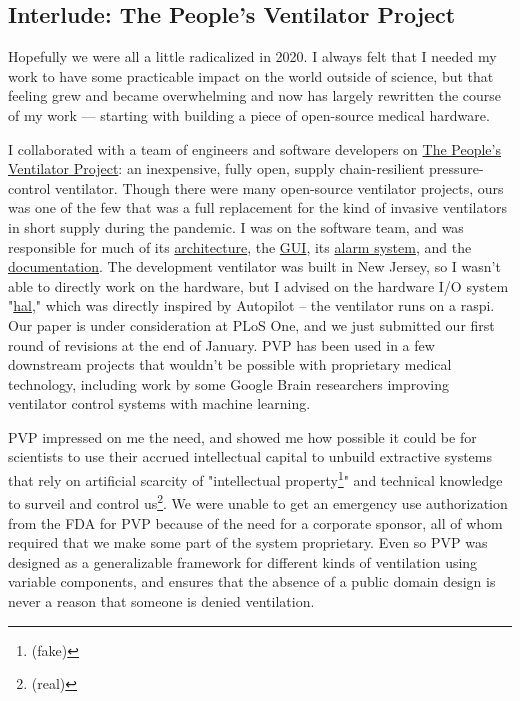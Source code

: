 \subsection{Interlude: The People's Ventilator Project}

Hopefully we were all a little radicalized in 2020. I always felt that I needed my work to have some practicable impact on the world outside of science, but that feeling grew and became overwhelming and now has largely rewritten the course of my work --- starting with building a piece of open-source medical hardware.

\begin{done}
I collaborated with a team of engineers and software developers on \href{https://www.peoplesvent.org/en/latest/}{The People's Ventilator Project}\cite{lachancePVP1PeopleVentilator2020}: an inexpensive, fully open, supply chain-resilient pressure-control ventilator. Though there were many open-source ventilator projects, ours was one of the few that was a full replacement for the kind of invasive ventilators in short supply during the pandemic. I was on the software team, and was responsible for much of its \href{https://www.peoplesvent.org/en/latest/software/software_overview.html}{architecture}, the \href{https://www.peoplesvent.org/en/latest/software/gui/index.html}{GUI}, its \href{https://www.peoplesvent.org/en/latest/software/alarm/index.html}{alarm system}, and the \href{https://github.com/CohenLabPrinceton/pvp/tree/master/_docs}{documentation}. The development ventilator was built in New Jersey, so I wasn't able to directly work on the hardware, but I advised on the hardware I/O system "\href{https://github.com/CohenLabPrinceton/pvp/blob/master/pvp/io/hal.py}{hal}," which  was directly inspired by Autopilot -- the ventilator runs on a raspi. Our paper is under consideration at PLoS One, and we just submitted our first round of revisions at the end of January. PVP has been used in a few downstream projects that wouldn't be possible with proprietary medical technology, including work by some Google Brain researchers improving ventilator control systems with machine learning\cite{suoMachineLearningMechanical2022}.
\end{done}

PVP impressed on me the need, and showed me how possible it could be for scientists to use their accrued intellectual capital to unbuild extractive systems that rely on artificial scarcity of "intellectual property\footnote{(fake)}" and technical knowledge to surveil and control us\footnote{(real)}\cite{warkCapitalDeadThis2019}. We were unable to get an emergency use authorization from the FDA for PVP because of the need for a corporate sponsor, all of whom required that we make some part of the system proprietary. Even so PVP was designed as a generalizable framework for different kinds of ventilation using variable components, and ensures that the absence of a public domain design is never a reason that someone is denied ventilation.
